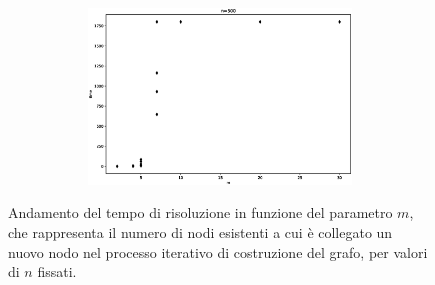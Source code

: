 \begin{figure}[h!]
\begin{subfigure}[b]{\textwidth}
\begin{subfigure}[b]{0.32\textwidth}
	     \end{subfigure}
	     \hspace{0em}
	      \begin{subfigure}[b]{0.32\textwidth}
	         \includegraphics[width=\columnwidth]{images/bagm5.eps}
	     \end{subfigure}
		\end{subfigure}
        \caption{Andamento del tempo di risoluzione in funzione del parametro $m$, che rappresenta il numero di nodi esistenti a cui è collegato un nuovo nodo nel processo iterativo di costruzione del grafo, per valori di $n$ fissati.}
        \label{fig:bagma}
\end{figure}

